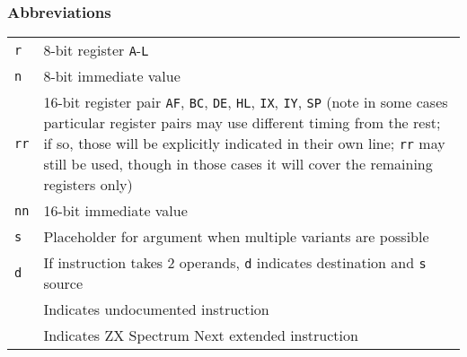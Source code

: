 \subsubsection{Abbreviations}

\begin{tabularx}{\textwidth}{lX}
	{\tt r} & 
		8-bit register {\tt A}-{\tt L} \\
	{\tt n} &
		8-bit immediate value \\
	{\tt rr} & 
		16-bit register pair {\tt AF}, {\tt BC}, {\tt DE}, {\tt HL}, {\tt IX}, {\tt IY}, {\tt SP} (note in some cases particular register pairs may use different timing from the rest; if so, those will be explicitly indicated in their own line; {\tt rr} may still be used, though in those cases it will cover the remaining registers only) \\
	{\tt nn} & 
		16-bit immediate value \\
	{\tt s} &
		Placeholder for argument when multiple variants are possible \\
	{\tt d} &
		If instruction takes 2 operands, {\tt d} indicates destination and {\tt s} source \\
	\UNDOC & Indicates undocumented instruction \\
	\ZXN & Indicates ZX Spectrum Next extended instruction \\		
\end{tabularx}


\pagebreak
\IntentionallyEmpty
\pagebreak



